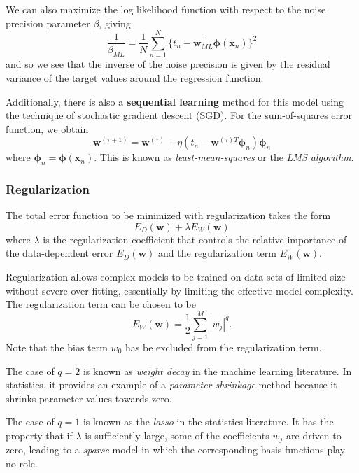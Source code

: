 \documentclass[a4paper]{book}
\renewcommand{\bf}{\mathbf}
\newcommand{\imp}[1]{\textit{#1}}
\newcommand{\bs}{\boldsymbol}
\begin{document}
We can also maximize the log likelihood function with respect to the noise precision parameter $\beta$, giving
\begin{equation}
	\frac{1}{\beta_{ML}} = \frac{1}{N} \sum_{n=1}^N \{ t_n - \bf{w}_{ML}^{\intercal} \bs{\phi}(\bf{x}_n) \}^2
\end{equation}
and so we see that the inverse of the noise precision is given by the residual variance of the target values around the regression function.

Additionally, there is also a \textbf{sequential learning} method for this model using the technique of stochastic gradient descent (SGD). For the sum-of-squares error function, we obtain
\begin{equation}
	\bf{w}^{(\tau+1)} = \bf{w}^{(\tau)} + \eta (t_n - \bf{w}^{(\tau)T} \bs{\phi}_n) \bs{\phi}_n
\end{equation}
where $\bs{\phi}_n = \bs{\phi}(\bf{x}_n)$. This is known as \imp{least-mean-squares} or the \imp{LMS algorithm}.
\subsubsection{Regularization}
The total error function to be minimized with regularization takes the form
\begin{equation}
	E_D(\bf{w}) + \lambda E_W(\bf{w})
\end{equation}
where $\lambda$ is the regularization coefficient that controls the relative importance of the data-dependent error $E_D(\bf{w})$ and the regularization term $E_W(\bf{w})$.

Regularization allows complex models to be trained on data sets of limited size without severe over-fitting, essentially by limiting the effective model complexity. The regularization term can be chosen to be
\begin{equation}
	E_W(\bf{w}) = \frac{1}{2} \sum_{j=1}^M |w_j|^q.
\end{equation}
Note that the bias term $w_0$ has be excluded from the regularization term.

The case of $q = 2$ is known as \imp{weight decay} in the machine learning literature. In statistics, it provides an example of a \imp{parameter shrinkage} method because it shrinks parameter values towards zero.

The case of $q = 1$ is known as the \imp{lasso} in the statistics literature. It has the property that if $\lambda$ is sufficiently large, some of the coefficients $w_j$ are driven to zero, leading to a \imp{sparse} model in which the corresponding basis functions play no role.
\end{document}
